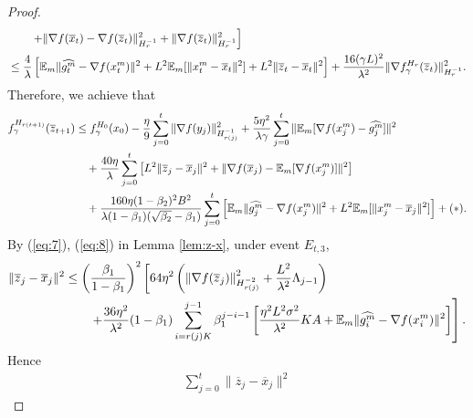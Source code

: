 \documentclass{article} %
\numberwithin{equation}{section}
\renewcommand{\eqref}[1]{(\ref{#1})}
\begin{document}
\begin{proof}
\begin{equation}
\begin{aligned}
            &\qquad \left. + \|\nabla f(\overline{x}_t)-\nabla f(\overline{z}_t)\|_{H_r^{-1}}^2 + \|\nabla f(\overline{z}_t)\|_{H_r^{-1}}^2\right] \\
            &\leq \frac{4}{\lambda}\left[\mathbb{E}_m\|\widehat{g_t^m}-\nabla f(x_t^m)\|^2 + L^2\mathbb{E}_m[\|x_t^m-\overline{x}_t\|^2] + L^2\|\overline{z}_t-\overline{x}_t\|^2\right] + \frac{16(\gamma L)^2}{\lambda^2}\|\nabla f_\gamma^{H_r}(\overline{z}_t)\|_{H_r^{-1}}^2.
        \end{aligned}
    \end{equation}
    Therefore, we achieve that
    \begin{equation}\label{eq:29}
        \begin{aligned}
            f_\gamma^{H_{r(t+1)}}(\overline{z}_{t+1}) 
            &\leq f_\gamma^{H_0}(x_0) - \frac{\eta}{9} \sum_{j=0}^t\|\nabla f(y_j)\|_{H_{r(j)}^{-1}}^2 + \frac{5\eta^2}{\lambda\gamma} \sum_{j=0}^t\|\mathbb{E}_m[\nabla f(x_j^m)-\widehat{g_j^m}]\|^2 \\
            &\quad + \frac{40\eta}{\lambda} \sum_{j=0}^t\left[L^2\|\overline{z}_j-\overline{x}_j\|^2 + \|\nabla f(\overline{x}_j)-\mathbb{E}_m[\nabla f(x_j^m)]\|^2\right] \\
            &\quad + \frac{160\eta(1-\beta_2)^2B^2}{\lambda(1-\beta_1)(\sqrt{\beta_2}-\beta_1)}
            \sum_{j=0}^t\left[\mathbb{E}_m\|\widehat{g_j^m}-\nabla f(x_j^m)\|^2 + L^2\mathbb{E}_m[\|x_j^m-\overline{x}_j\|^2]\right] + (*).
        \end{aligned}
    \end{equation}
    By \eqref{eq:7}, \eqref{eq:8} in Lemma \ref{lem:z-x}, under event $E_{t,3}$,
    \begin{equation}
        \begin{aligned}
            \|\overline{z}_j-\overline{x}_j\|^2 
            &\leq \left(\frac{\beta_1}{1-\beta_1}\right)^2 \left[64\eta^2\left( \left\|\nabla f(\overline{z}_j)\right\|_{H_{r(j)}^{-2}}^2 + \frac{L^2}{\lambda^2}\Lambda_{j-1}\right) \right. \\
            &\qquad \left. + \frac{36\eta^2}{\lambda^2}(1-\beta_1)\sum_{i=r(j)K}^{j-1}\beta_1^{j-i-1} \left[\frac{\eta^2L^2\sigma^2}{\lambda^2}KA+\mathbb{E}_m\|\widehat{g_i^m}-\nabla f(x_i^m)\|^2\right]\right].
        \end{aligned}
    \end{equation}
    Hence
    \begin{equation}
        \begin{aligned}
            \sum_{j=0}^t\|\overline{z}_j-\overline{x}_j\|^2 

\end{aligned}
\end{equation}
\end{proof}
\end{document}
